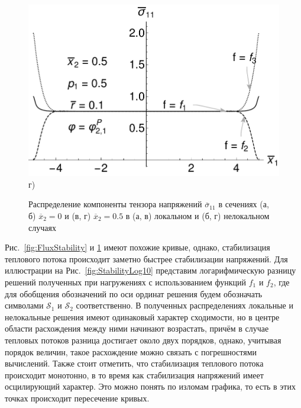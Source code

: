 \begin{figure}[ht]
\begin{minipage}[b][][b]{0.49\linewidth}
        \includegraphics[width=\linewidth]{pics/SaintVenantX05P05.pdf} \\ г)
    \end{minipage}
    \caption{Распределение компоненты тензора напряжений $\overline{\sigma}_{11}$ в сечениях (а, б) $\overline{x}_2 = 0$ и (в, г) $\overline{x}_2 = 0.5$ в (а, в) локальном и (б, г) нелокальном случаях}
    \label{fig:SaintVenant}
\end{figure}

Рис.~\ref{fig:FluxStability} и \ref{fig:SaintVenant} имеют похожие кривые, однако, стабилизация теплового потока происходит заметно быстрее стабилизации напряжений. Для иллюстрации на Рис.~\ref{fig:StabilityLog10} представим логарифмическую разницу решений полученных при нагружениях с использованием функций $f_1$ и $f_2$, где для обобщения обозначений по оси ординат решения будем обозначать символами  $\mathcal{S}_1$ и $\mathcal{S}_2$ соответственно. В полученных распределениях локальные и нелокальные решения имеют одинаковый характер сходимости, но в центре области расхождения между ними начинают возрастать, причём в случае тепловых потоков разница достигает около двух порядков, однако, учитывая порядок величин, такое расхождение можно связать с погрешностями вычислений. Также стоит отметить, что стабилизация теплового потока происходит монотонно, в то время как стабилизация напряжений имеет осцилирующий характер. Это можно понять по изломам графика, то есть в этих точках происходит пересечение кривых.

